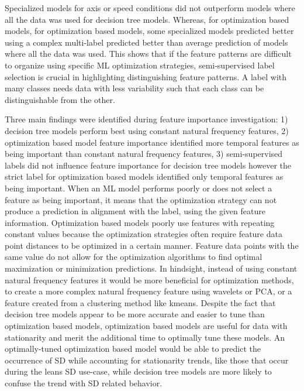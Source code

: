\documentclass[11pt, onecolumn]{article}
\begin{document}
Specialized models for axis or speed conditions did not outperform models where all the data was used for decision tree models.  Whereas, for optimization based models, for optimization based models, some specialized models predicted better using a complex multi-label predicted better than average prediction of models where all the data was used.  This shows that if the feature patterns are difficult to organize using specific ML optimization strategies, semi-supervised label selection is crucial in highlighting distinguishing feature patterns.  A label with many classes needs data with less variability such that each class can be distinguishable from the other.

Three main findings were identified during feature importance investigation: 1) decision tree models perform best using constant natural frequency features, 2) optimization based model feature importance identified more temporal features as being important than constant natural frequency features, 3) semi-supervised labels did not influence feature importance for decision tree models however the strict label for optimization based models identified only temporal features as being important.  When an ML model performs poorly or does not select a feature as being important, it means that the optimization strategy can not produce a prediction in alignment with the label, using the given feature information.  Optimization based models poorly use features with repeating constant values because the optimization strategies often require feature data point distances to be optimized in a certain manner. Feature data points with the same value do not allow for the optimization algorithms to find optimal maximization or minimization predictions.  In hindsight, instead of using constant natural frequency features it would be more beneficial for optimization methods, to create a more complex natural frequency feature using wavelets or PCA, or a feature created from a clustering method like kmeans.  Despite the fact that decision tree models appear to be more accurate and easier to tune than optimization based models, optimization based models are useful for data with stationarity and merit the additional time to optimally tune these models.  An optimally-tuned optimization based model would be able to predict the occurrence of SD while accounting for stationarity trends, like those that occur during the leans SD use-case, while decision tree models are more likely to confuse the trend with SD related behavior. 
\end{document}
